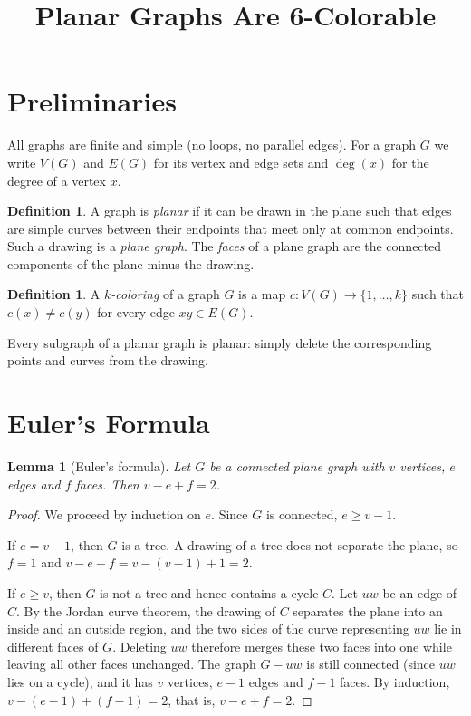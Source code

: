 \documentclass[11pt]{article}
\title{Planar Graphs Are 6-Colorable}
\author{}
\date{}
\newtheorem{lemma}[theorem]{Lemma}
\theoremstyle{definition}
\newtheorem{definition}[theorem]{Definition}
\begin{document}
\maketitle

\section{Preliminaries}

All graphs are finite and simple (no loops, no parallel edges).
For a graph $G$ we write $V(G)$ and $E(G)$ for its vertex and edge sets and
$\deg(x)$ for the degree of a vertex $x$.

\begin{definition}
  A graph is \emph{planar} if it can be drawn in the plane such that edges
  are simple curves between their endpoints that meet only at common
  endpoints. Such a drawing is a \emph{plane graph}. The \emph{faces} of a
  plane graph are the connected components of the plane minus the drawing.
\end{definition}

\begin{definition}
  A \emph{$k$-coloring} of a graph $G$ is a map
  $c \colon V(G) \to \{1,\dots,k\}$ such that $c(x) \neq c(y)$ for every
  edge $xy \in E(G)$.
\end{definition}

Every subgraph of a planar graph is planar: simply delete the corresponding
points and curves from the drawing.

\section{Euler's Formula}

\begin{lemma}[Euler's formula]\label{lem:euler}
  Let $G$ be a connected plane graph with $v$ vertices, $e$ edges and
  $f$ faces. Then $v - e + f = 2$.
\end{lemma}

\begin{proof}
  We proceed by induction on $e$. Since $G$ is connected, $e \geq v - 1$.

  If $e = v - 1$, then $G$ is a tree. A drawing of a tree does not separate
  the plane, so $f = 1$ and $v - e + f = v - (v-1) + 1 = 2$.

  If $e \geq v$, then $G$ is not a tree and hence contains a cycle $C$.
  Let $uw$ be an edge of $C$. By the Jordan curve theorem, the drawing of $C$
  separates the plane into an inside and an outside region, and the two
  sides of the curve representing $uw$ lie in different faces of $G$.
  Deleting $uw$ therefore merges these two faces into one while leaving all
  other faces unchanged. The graph $G - uw$ is still connected (since $uw$
  lies on a cycle), and it has $v$ vertices, $e - 1$ edges and $f - 1$ faces.
  By induction, $v - (e-1) + (f-1) = 2$, that is, $v - e + f = 2$.
\end{proof}
\end{document}

